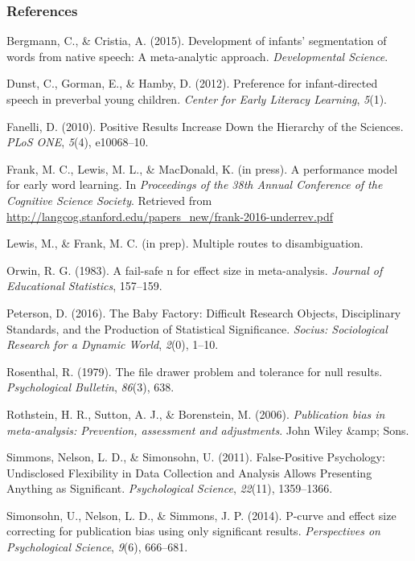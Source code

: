\documentclass[american,floatsintext,man]{apa6}
\begin{document}
\subsubsection{References}\label{references}

\setlength{\parindent}{-0.5in} \setlength{\leftskip}{0.5in}
\setlength{\parskip}{8pt}

Bergmann, C., \& Cristia, A. (2015). Development of infants'
segmentation of words from native speech: A meta-analytic approach.
\emph{Developmental Science}.

Dunst, C., Gorman, E., \& Hamby, D. (2012). Preference for
infant-directed speech in preverbal young children. \emph{Center for
Early Literacy Learning}, \emph{5}(1).

Fanelli, D. (2010). Positive Results Increase Down the Hierarchy of the
Sciences. \emph{PLoS ONE}, \emph{5}(4), e10068--10.

Frank, M. C., Lewis, M. L., \& MacDonald, K. (in press). A performance
model for early word learning. In \emph{Proceedings of the 38th Annual
Conference of the Cognitive Science Society}. Retrieved from
\url{http://langcog.stanford.edu/papers_new/frank-2016-underrev.pdf}

Lewis, M., \& Frank, M. C. (in prep). Multiple routes to disambiguation.

Orwin, R. G. (1983). A fail-safe n for effect size in meta-analysis.
\emph{Journal of Educational Statistics}, 157--159.

Peterson, D. (2016). The Baby Factory: Difficult Research Objects,
Disciplinary Standards, and the Production of Statistical Significance.
\emph{Socius: Sociological Research for a Dynamic World}, \emph{2}(0),
1--10.

Rosenthal, R. (1979). The file drawer problem and tolerance for null
results. \emph{Psychological Bulletin}, \emph{86}(3), 638.

Rothstein, H. R., Sutton, A. J., \& Borenstein, M. (2006).
\emph{Publication bias in meta-analysis: Prevention, assessment and
adjustments}. John Wiley \&amp; Sons.

Simmons, Nelson, L. D., \& Simonsohn, U. (2011). False-Positive
Psychology: Undisclosed Flexibility in Data Collection and Analysis
Allows Presenting Anything as Significant. \emph{Psychological Science},
\emph{22}(11), 1359--1366.

Simonsohn, U., Nelson, L. D., \& Simmons, J. P. (2014). P-curve and
effect size correcting for publication bias using only significant
results. \emph{Perspectives on Psychological Science}, \emph{9}(6),
666--681.
\end{document}
